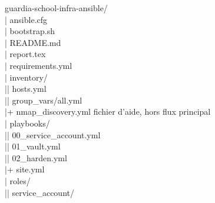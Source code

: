 \documentclass[11pt,a4paper]{article}
\newcommand{\iconDir}{\textcolor{AccentBlue}{\faFolderOpen}}
\begin{document}
\begin{tcolorbox}[
  enhanced,
  colback=LightGray,
  colframe=BorderGray,
  boxrule=0.8pt,
  arc=8pt,
  fontupper=\ttfamily\small,
  left=12pt,right=12pt,top=10pt,bottom=10pt,
  title={\iconDir\hspace{0.4em}\textbf{Arborescence du dépôt actuel}},
  fonttitle=\bfseries\small,
  coltitle=PrimaryBlue,
  attach boxed title to top left={yshift=-2mm,xshift=6mm},
  boxed title style={colback=LightGray,colframe=BorderGray,arc=4pt,boxrule=0.8pt}
]
guardia-school-infra-ansible/\\
\textcolor{PrimaryBlue}{|} ansible.cfg \\
\textcolor{PrimaryBlue}{|} bootstrap.sh \\
\textcolor{PrimaryBlue}{|} README.md \\
\textcolor{PrimaryBlue}{|} report.tex \\
\textcolor{PrimaryBlue}{|} requirements.yml \\
\textcolor{PrimaryBlue}{|} inventory/\\
\textcolor{PrimaryBlue}{|}\hspace{1em}\textcolor{PrimaryBlue}{|} hosts.yml \\
\textcolor{PrimaryBlue}{|}\hspace{1em}\textcolor{PrimaryBlue}{|} group\_vars/all.yml \\
\textcolor{PrimaryBlue}{|}\hspace{1em}\textcolor{PrimaryBlue}{+} nmap\_discovery.yml \hfill \normalfont\small\textcolor{MediumGray}{fichier d'aide, hors flux principal}\\
\textcolor{PrimaryBlue}{|} playbooks/\\
\textcolor{PrimaryBlue}{|}\hspace{1em}\textcolor{PrimaryBlue}{|} 00\_service\_account.yml \\
\textcolor{PrimaryBlue}{|}\hspace{1em}\textcolor{PrimaryBlue}{|} 01\_vault.yml \\
\textcolor{PrimaryBlue}{|}\hspace{1em}\textcolor{PrimaryBlue}{|} 02\_harden.yml \\
\textcolor{PrimaryBlue}{|}\hspace{1em}\textcolor{PrimaryBlue}{+} site.yml \\
\textcolor{PrimaryBlue}{|} roles/\\
\textcolor{PrimaryBlue}{|}\hspace{1em}\textcolor{PrimaryBlue}{|} service\_account/ \\

\end{tcolorbox}
\end{document}
